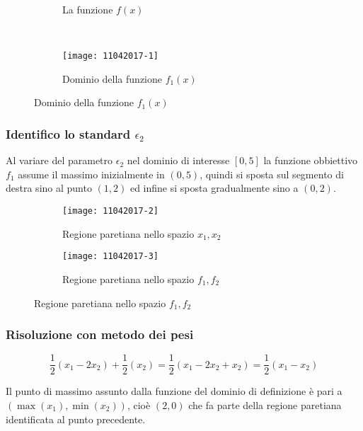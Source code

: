 \documentclass[\main/main.tex]{subfiles}
\begin{document}
\begin{figure}
  \begin{subfigure}{0.45\textwidth}
    \caption{La funzione $f(x)$}
  \end{subfigure}
  ~
  \begin{subfigure}{0.45\textwidth}
    \texttt{[image: 11042017-1]}
    \caption{Dominio della funzione $f_1(x)$}
  \end{subfigure}
\end{figure}

\subsubsection*{Identifico lo standard $\epsilon_2$}
Al variare del parametro $\epsilon_2$ nel dominio di interesse $[0,5]$ la funzione obbiettivo $f_1$ assume il massimo inizialmente in $(0,5)$, quindi si sposta sul segmento di destra sino al punto $(1,2)$ ed infine si sposta gradualmente sino a $(0,2)$.

\begin{figure}
  \begin{subfigure}{0.45\textwidth}
    \texttt{[image: 11042017-2]}
    \caption{Regione paretiana nello spazio $x_1, x_2$}
  \end{subfigure}
  \begin{subfigure}{0.45\textwidth}
    \texttt{[image: 11042017-3]}
    \caption{Regione paretiana nello spazio $f_1, f_2$}
  \end{subfigure}
\end{figure}

\subsubsection*{Risoluzione con metodo dei pesi}
\[
  \frac{1}{2}(x_1 - 2x_2) + \frac{1}{2}(x_2) = \frac{1}{2}(x_1 - 2x_2 + x_2) = \frac{1}{2}(x_1 - x_2)
\]

Il punto di massimo assunto dalla funzione del dominio di definizione è pari a $(\max(x_1), \min(x_2))$, cioè $(2,0)$ che fa parte della regione paretiana identificata al punto precedente.
\end{document}
